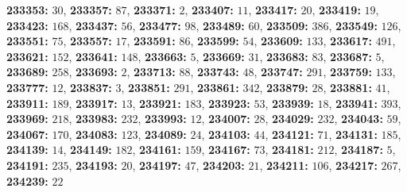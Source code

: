 \textsf{\bfseries 233353:} $30$, \textsf{\bfseries 233357:} $87$, \textsf{\bfseries 233371:} $2$, \textsf{\bfseries 233407:} $11$, \textsf{\bfseries 233417:} $20$, \textsf{\bfseries 233419:} $19$, \textsf{\bfseries 233423:} $168$, \textsf{\bfseries 233437:} $56$, \textsf{\bfseries 233477:} $98$, \textsf{\bfseries 233489:} $60$, \textsf{\bfseries 233509:} $386$, \textsf{\bfseries 233549:} $126$, \textsf{\bfseries 233551:} $75$, \textsf{\bfseries 233557:} $17$, \textsf{\bfseries 233591:} $86$, \textsf{\bfseries 233599:} $54$, \textsf{\bfseries 233609:} $133$, \textsf{\bfseries 233617:} $491$, \textsf{\bfseries 233621:} $152$, \textsf{\bfseries 233641:} $148$, \textsf{\bfseries 233663:} $5$, \textsf{\bfseries 233669:} $31$, \textsf{\bfseries 233683:} $83$, \textsf{\bfseries 233687:} $5$, \textsf{\bfseries 233689:} $258$, \textsf{\bfseries 233693:} $2$, \textsf{\bfseries 233713:} $88$, \textsf{\bfseries 233743:} $48$, \textsf{\bfseries 233747:} $291$, \textsf{\bfseries 233759:} $133$, \textsf{\bfseries 233777:} $12$, \textsf{\bfseries 233837:} $3$, \textsf{\bfseries 233851:} $291$, \textsf{\bfseries 233861:} $342$, \textsf{\bfseries 233879:} $28$, \textsf{\bfseries 233881:} $41$, \textsf{\bfseries 233911:} $189$, \textsf{\bfseries 233917:} $13$, \textsf{\bfseries 233921:} $183$, \textsf{\bfseries 233923:} $53$, \textsf{\bfseries 233939:} $18$, \textsf{\bfseries 233941:} $393$, \textsf{\bfseries 233969:} $218$, \textsf{\bfseries 233983:} $232$, \textsf{\bfseries 233993:} $12$, \textsf{\bfseries 234007:} $28$, \textsf{\bfseries 234029:} $232$, \textsf{\bfseries 234043:} $59$, \textsf{\bfseries 234067:} $170$, \textsf{\bfseries 234083:} $123$, \textsf{\bfseries 234089:} $24$, \textsf{\bfseries 234103:} $44$, \textsf{\bfseries 234121:} $71$, \textsf{\bfseries 234131:} $185$, \textsf{\bfseries 234139:} $14$, \textsf{\bfseries 234149:} $182$, \textsf{\bfseries 234161:} $159$, \textsf{\bfseries 234167:} $73$, \textsf{\bfseries 234181:} $212$, \textsf{\bfseries 234187:} $5$, \textsf{\bfseries 234191:} $235$, \textsf{\bfseries 234193:} $20$, \textsf{\bfseries 234197:} $47$, \textsf{\bfseries 234203:} $21$, \textsf{\bfseries 234211:} $106$, \textsf{\bfseries 234217:} $267$, \textsf{\bfseries 234239:} $22$